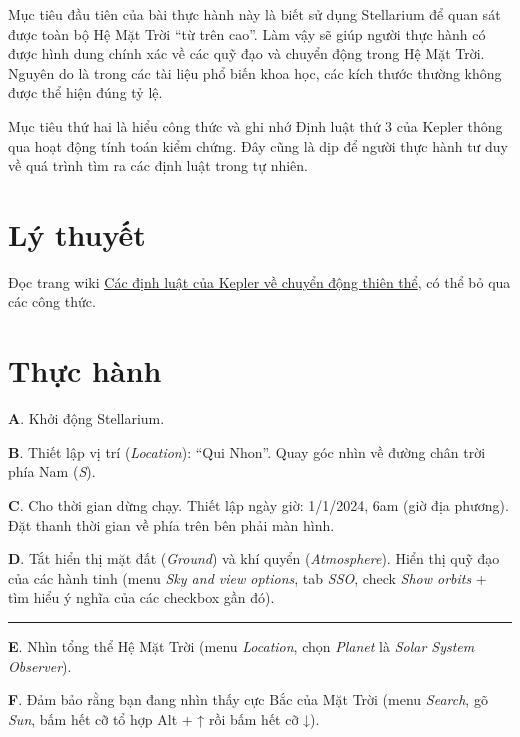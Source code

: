 \documentclass[
  a4paper,
]{book}
\begin{document}
Mục tiêu đầu tiên của bài thực hành này là biết sử dụng Stellarium để quan sát được toàn bộ Hệ Mặt Trời ``từ trên cao''. Làm vậy sẽ giúp người thực hành có được hình dung chính xác về các quỹ đạo và chuyển động trong Hệ Mặt Trời. Nguyên do là trong các tài liệu phổ biến khoa học, các kích thước thường không được thể hiện đúng tỷ lệ.

Mục tiêu thứ hai là hiểu công thức và ghi nhớ Định luật thứ 3 của Kepler thông qua hoạt động tính toán kiểm chứng. Đây cũng là dịp để người thực hành tư duy về quá trình tìm ra các định luật trong tự nhiên.

\section{Lý thuyết}\label{luxfd-thuyux1ebft-2}

Đọc trang wiki \href{https://vi.wikipedia.org/wiki/C\%C3\%A1c_\%C4\%91\%E1\%BB\%8Bnh_lu\%E1\%BA\%ADt_Kepler_v\%E1\%BB\%81_chuy\%E1\%BB\%83n_\%C4\%91\%E1\%BB\%99ng_thi\%C3\%AAn_th\%E1\%BB\%83}{Các định luật của Kepler về chuyển động thiên thể}, có thể bỏ qua các công thức.

\section{Thực hành}\label{thux1ef1c-huxe0nh-2}

\textbf{A}. Khởi động Stellarium.

\textbf{B}. Thiết lập vị trí (\emph{Location}): ``Qui Nhon''. Quay góc nhìn về đường chân trời phía Nam (\emph{S}).

\textbf{C}. Cho thời gian dừng chạy. Thiết lập ngày giờ: 1/1/2024, 6am (giờ địa phương). Đặt thanh thời gian về phía trên bên phải màn hình.

\textbf{D}. Tắt hiển thị mặt đất (\emph{Ground}) và khí quyển (\emph{Atmosphere}). Hiển thị quỹ đạo của các hành tinh (menu \emph{Sky and view options}, tab \emph{SSO}, check \emph{Show orbits} + tìm hiểu ý nghĩa của các checkbox gần đó).

\begin{center}\rule{0.5\linewidth}{0.5pt}\end{center}

\textbf{E}. Nhìn tổng thể Hệ Mặt Trời (menu \emph{Location}, chọn \emph{Planet} là \emph{Solar System Observer}).

\textbf{F}. Đảm bảo rằng bạn đang nhìn thấy cực Bắc của Mặt Trời (menu \emph{Search}, gõ \emph{Sun}, bấm hết cỡ tổ hợp Alt + ↑ rồi bấm hết cỡ ↓).
\end{document}
